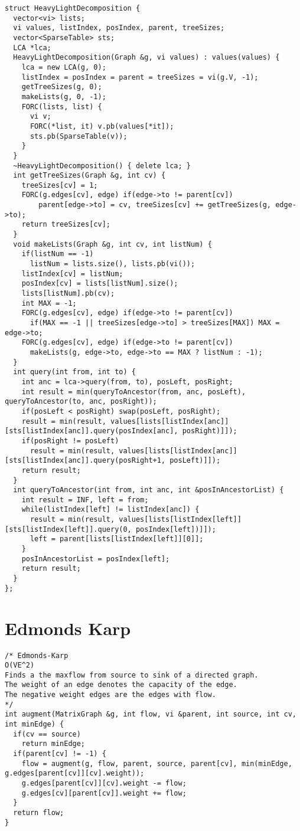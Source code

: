 \documentclass[8pt, oneside]{extarticle}
\begin{document}
\begin{multicols}{3}
\begin{lstlisting}
struct HeavyLightDecomposition {
  vector<vi> lists;
  vi values, listIndex, posIndex, parent, treeSizes;
  vector<SparseTable> sts;
  LCA *lca;
  HeavyLightDecomposition(Graph &g, vi values) : values(values) {
    lca = new LCA(g, 0);
    listIndex = posIndex = parent = treeSizes = vi(g.V, -1);
    getTreeSizes(g, 0);
    makeLists(g, 0, -1);
    FORC(lists, list) {
      vi v;
      FORC(*list, it) v.pb(values[*it]);
      sts.pb(SparseTable(v));
    }
  }
  ~HeavyLightDecomposition() { delete lca; }
  int getTreeSizes(Graph &g, int cv) {
    treeSizes[cv] = 1;
    FORC(g.edges[cv], edge) if(edge->to != parent[cv])
        parent[edge->to] = cv, treeSizes[cv] += getTreeSizes(g, edge->to);  
    return treeSizes[cv];
  }
  void makeLists(Graph &g, int cv, int listNum) {
    if(listNum == -1)
      listNum = lists.size(), lists.pb(vi());
    listIndex[cv] = listNum;
    posIndex[cv] = lists[listNum].size();
    lists[listNum].pb(cv);
    int MAX = -1;
    FORC(g.edges[cv], edge) if(edge->to != parent[cv])
      if(MAX == -1 || treeSizes[edge->to] > treeSizes[MAX]) MAX = edge->to;
    FORC(g.edges[cv], edge) if(edge->to != parent[cv])
      makeLists(g, edge->to, edge->to == MAX ? listNum : -1);  
  }
  int query(int from, int to) {
    int anc = lca->query(from, to), posLeft, posRight;
    int result = min(queryToAncestor(from, anc, posLeft), queryToAncestor(to, anc, posRight));
    if(posLeft < posRight) swap(posLeft, posRight);
    result = min(result, values[lists[listIndex[anc]][sts[listIndex[anc]].query(posIndex[anc], posRight)]]);
    if(posRight != posLeft)
      result = min(result, values[lists[listIndex[anc]][sts[listIndex[anc]].query(posRight+1, posLeft)]]);
    return result;
  }
  int queryToAncestor(int from, int anc, int &posInAncestorList) {
    int result = INF, left = from;
    while(listIndex[left] != listIndex[anc]) {
      result = min(result, values[lists[listIndex[left]][sts[listIndex[left]].query(0, posIndex[left])]]);
      left = parent[lists[listIndex[left]][0]];
    }
    posInAncestorList = posIndex[left];
    return result;
  }
};
\end{lstlisting}

\section{Edmonds Karp}
\begin{lstlisting}
/* Edmonds-Karp
O(VE^2)
Finds a the maxflow from source to sink of a directed graph.
The weight of an edge denotes the capacity of the edge.
The negative weight edges are the edges with flow.
*/
int augment(MatrixGraph &g, int flow, vi &parent, int source, int cv, int minEdge) {
  if(cv == source)
    return minEdge;
  if(parent[cv] != -1) {
    flow = augment(g, flow, parent, source, parent[cv], min(minEdge, g.edges[parent[cv]][cv].weight));
    g.edges[parent[cv]][cv].weight -= flow;
    g.edges[cv][parent[cv]].weight += flow;
  }
  return flow;
}


\end{lstlisting}
\end{multicols}
\end{document}
